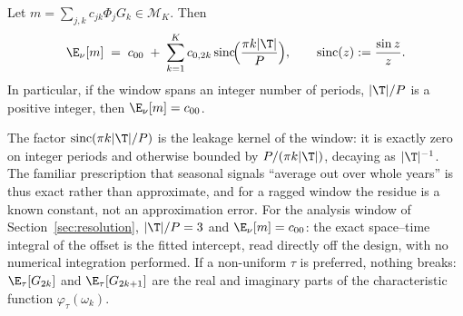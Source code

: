 \begin{lemma}
\label{lem:exact-integral}
Let $m=\sum_{j,k}c_{jk}\Phi_jG_k\in\mathcal M_K$. Then
\begin{equation}
  \E_\nu[m]\;=\;c_{00}\;+\;\sum_{k=1}^{K}c_{0,2k}\,
  \mathrm{sinc}\!\Big(\frac{\pi k|\T|}{P}\Big),
  \qquad \mathrm{sinc}(z):=\frac{\sin z}{z}.
  \label{eq:exact-integral}
\end{equation}
In particular, if the window spans an integer number of periods,
$|\T|/P$ is a positive integer, then $\E_\nu[m]=c_{00}$.
\end{lemma}

\begin{remark}
\label{rem:leakage-window}
The factor $\mathrm{sinc}(\pi k|\T|/P)$ is the leakage kernel of the
window: it is exactly zero on integer periods and otherwise bounded by
$P/(\pi k|\T|)$, decaying as $|\T|^{-1}$. The familiar prescription that
seasonal signals ``average out over whole years'' is thus exact rather
than approximate, and for a ragged window the residue is a known
constant, not an approximation error. For the analysis window of
Section~\ref{sec:resolution}, $|\T|/P=3$ and $\E_\nu[m]=c_{00}$: the
exact space--time integral of the offset is the fitted intercept, read
directly off the design, with no numerical integration performed. If a
non-uniform $\tau$ is preferred, nothing breaks: $\E_\tau[G_{2k}]$ and
$\E_\tau[G_{2k+1}]$ are the real and imaginary parts of the
characteristic function $\varphi_\tau(\omega_k)$.
\end{remark}

